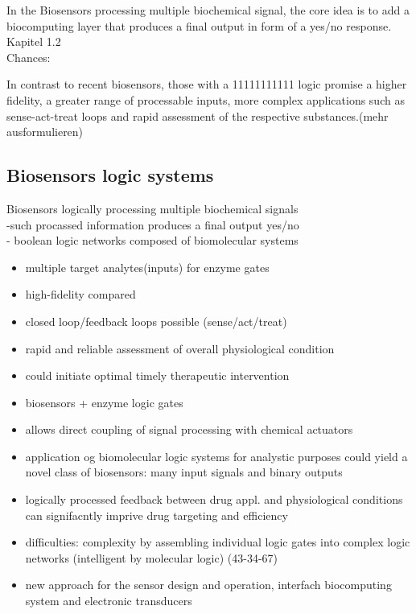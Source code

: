 \documentclass[runningheads]{llncs}
\begin{document}
	In the Biosensors processing multiple biochemical signal, the core idea is to add a biocomputing layer that produces a final output in form of a yes/no response. Kapitel 1.2\\
	
	Chances:
	
	
	
	
	In contrast to recent biosensors, those with a 11111111111 logic promise a higher fidelity, a greater range of processable inputs, more complex applications such as sense-act-treat loops and rapid assessment of the respective substances.(mehr ausformulieren)
	
	
	

\subsection{Biosensors  logic systems}
Biosensors logically processing multiple biochemical signals\\
-such procassed information produces a final output yes/no \\
- boolean logic networks composed of biomolecular systems\\	
\begin{itemize}
	\item multiple target analytes(inputs) for enzyme gates
	\item high-fidelity compared
	\item closed loop/feedback loops possible (sense/act/treat)
	\item rapid and reliable assessment of overall physiological condition
	\item could initiate optimal timely therapeutic intervention
	\item biosensors + enzyme logic gates
	\item allows direct coupling of signal processing with chemical actuators 
	\item application og biomolecular logic systems for analystic purposes could yield a novel class of biosensors: many input signals and binary outputs
	\item logically processed feedback between drug appl. and physiological conditions can signifacntly imprive drug targeting and efficiency 
	
	\item difficulties: complexity by assembling individual logic gates into complex logic networks (intelligent by molecular logic) (43-34-67)
	\item new approach for the sensor design and operation, interfach biocomputing system and electronic transducers
\end{itemize}
\end{document}
